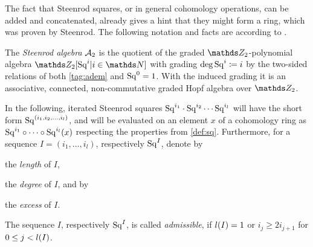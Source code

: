 The fact that Steenrod squares, or in general cohomology operations,
can be added and concatenated, already gives a hint that they might
form a ring, which was proven by Steenrod. The following notation and
facts are according to \cite[Chap.~6]{mosher}.
\begin{Def}
  The \emph{Steenrod algebra} $\mathcal{A}_2$ is the quotient
  of the graded $\Zmod2$-polynomial algebra
  $\Zmod2[\Sq i|i\in\Nat]$ with grading $\deg \mathrm{Sq}^{i}\coloneqq i$
  by the two-sided relations of both \ref{tag:adem} and $\mathrm{Sq}^{0}=1$.
  With the induced grading it is an associative, connected,
  non-commutative graded Hopf algebra over $\Zmod2$.
\end{Def}
\begin{Not}
  In the following, iterated Steenrod squares
  $\mathrm{Sq}^{i_1}\cdot\mathrm{Sq}^{i_2}\dotsm\mathrm{Sq}^{i_l}$ will have the short form
  $\mathrm{Sq}^{(i_1,i_2,\dotsc,i_l)}$,
  and will be evaluated on an element $x$ of a cohomology ring as
  $\mathrm{Sq}^{i_1}\circ\dotsb\circ\mathrm{Sq}^{i_l}(x)$ respecting the
  properties from \autoref{def:sq}.
  Furthermore, for a sequence $I=(i_1,\dotsc,i_l)$,
  respectively $\mathrm{Sq}^{I}$, denote by
  \begin{description}[labelindent=1em]
  \item[$\l(I)\coloneqq l$] the \emph{length} of $I$,
  \item[$\d(I)\coloneqq \sum_{j=0}^{l} i_j$] the \emph{degree} of $I$,
    and by
  \item[$\e(I)\coloneqq 2i_1-\d(I)=\sum_{j=1}^{l-1}(i_j-2i_{j+1})$]
    the \emph{excess} of $I$.
  \end{description}
  The sequence $I$, respectively $\mathrm{Sq}^{I}$, is called \emph{admissible},
  if $l(I)=1$ or $i_j\geq 2i_{j+1}$ for $0\leq j<l(I)$.
\end{Not}

